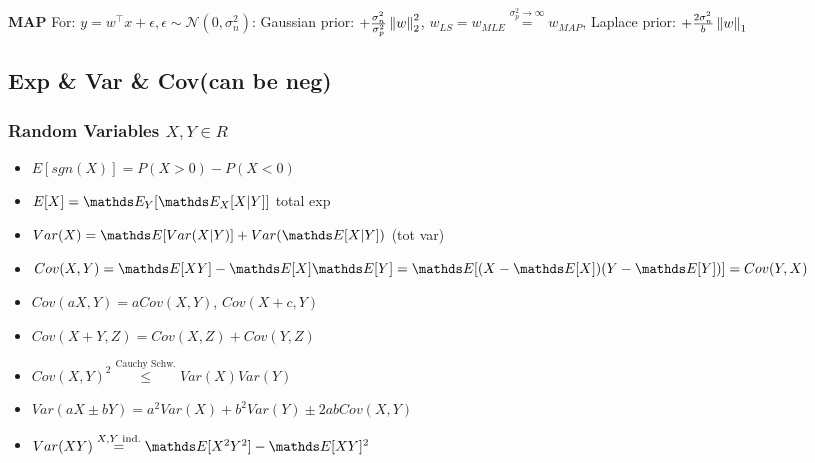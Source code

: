 

%
%

\textbf{MAP}
For: $y=w^{\top}x + \epsilon, \epsilon \sim \mathcal{N}(0, \sigma_{n}^{2})$:
Gaussian prior: $+\frac{\sigma_{n}^{2}}{\sigma_{p}^{2}} \left\lVert w\right\rVert_{2}^{2}$,
$w_{LS} = w_{MLE}\overset{\sigma_{p}^{2} \rightarrow \infty}{=} w_{MAP}$,
Laplace prior: $+\frac{2\sigma_{n}^{2}}{b} \left\lVert w\right\rVert_{1}$


\subsection{Exp \& Var \& Cov(can be neg)}
\subsubsection{Random Variables $X,Y \in R$} \label{random vars}
\begin{itemize}
    \item $E[sgn(X)] = P(X>0)-P(X<0)$
    \item $E[X] = \E[Y]{\E[X]{X|Y}}$ total exp
    \item $Var(X) = \E {Var(X|Y)} + Var(\E {X|Y})$ (tot var)
    \item $Cov(X,Y) = \E {XY} - \E {X}\E {Y} = \E{(X - \E {X})(Y - \E {Y})} = Cov(Y,X)$
    \item $Cov(aX,Y) = aCov(X,Y)$, $Cov(X +c,Y)$
    \item $Cov(X+Y, Z) = Cov(X,Z) + Cov(Y,Z)$
    \item $Cov(X,Y)^{2} \overset{\text{Cauchy Schw.}}{\leq} Var(X)Var(Y)$
    \item $Var(aX \pm bY) = a^{2}Var(X)+b^{2}Var(Y) \pm 2abCov(X,Y)$
    \item $Var(XY) \overset{X,Y \text{ ind.}}{=} \E {X^{2}Y^{2}} - \E {XY}^{2}$
\end{itemize}
